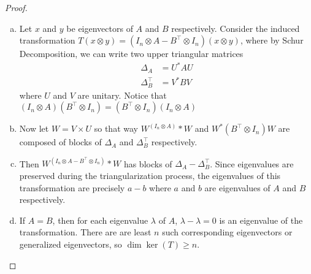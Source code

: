 \documentclass{article}
\begin{document}
\begin{proof} ~
  \begin{enumerate}[(a)]
    \item Let $x$ and $y$ be eigenvectors of $A$ and $B$ respectively.
    Consider the induced transformation
    $T(x \otimes y) = (I_n \otimes A - B^\top \otimes I_n)(x \otimes y)$,
    where by Schur Decomposition, we can write two upper triangular
    matrices \begin{align*}
      \Delta_A &= U^*AU \\
      \Delta_B^\top &= V^*BV
    \end{align*} where $U$ and $V$ are unitary. Notice that $(I_n \otimes A)(B^\top \otimes I_n) = (B^\top \otimes I_n)(I_n \otimes A)$
    \item Now let $W = V \times U$ so that way $W^(I_n \otimes A)*W$ and
    $W^*(B^\top \otimes I_n)W$ are composed of blocks of $\Delta_A$ and
    $\Delta_B^\top$ respectively.
    \item Then $W^(I_n \otimes A - B^\top \otimes I_n)*W$ has blocks of
    $\Delta_A - \Delta_B^\top$. Since eigenvalues are preserved during the triangularization process, the eigenvalues of this transformation are
    precisely $a - b$ where $a$ and $b$ are eigenvalues of $A$ and $B$ respectively.
    \item If $A = B$, then for each eigenvalue $\lambda$ of $A$, $\lambda - \lambda = 0$ is an eigenvalue of the transformation. There are are least $n$ such
    corresponding eigenvectors or generalized eigenvectors, so $\dim\ker(T) \geq n$.
  \end{enumerate}
\end{proof}
\end{document}
